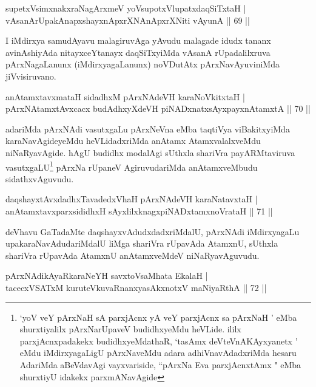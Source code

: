 \begin{shl}
supetxV\s simxnakxraNagArxmeV yoV\s supotxV\s lupatxdaqSiTxtaH |\\
vAsanArUpakAnapxshayxnApxrXNAnApxrXNiti vAyunA \hfill || 69 ||
\end{shl}

\begin{artha}
I iMdirxya samudAyavu malagiruvAga yAvudu malagade idudx tananx avinAshiyAda nitayxceYtanayx daqSiTxyiMda vAsanA rUpadalilxruva pArxNagaLanunx (iMdirxyagaLanunx) noVDutAtx pArxNavAyuviniMda jiVvisiruvano.
\end{artha}

\begin{shl}
anAtamxtavxmataH sidadhxM pArxNAdeVH karaNoVkitxtaH |\\
pArxNAtamxtAvxcacx budAdhxyXdeVH piNADxnatxsAyxpayxnAtamxtA \hfill || 70 ||
\end{shl}

\begin{artha}
adariMda pArxNAdi vasutxgaLu pArxNeVna eMba taqtiVya viBakitxyiMda karaNavAgideyeMdu heVLidadxriMda anAtamx AtamxvalalxveMdu niNaRyavAgide. hAgU budidhx modalAgi sUthxla shariVra payARMtaviruva vasutxgaLU\footnote[1]{`yoV veY pArxNaH sA parxjAcnx yA veY parxjAcnx sa pArxNaH ' eMba shurxtiyalilx pArxNarUpaveV budidhxyeMdu heVLide. ililx parxjAcnxpadakekx budidhxyeMdathaR, `tasAmx deVteVnAKAyxyanetx ' eMdu iMdirxyagaLigU pArxNaveMdu adara adhiVnavAdadxriMda hesaru AdariMda aBeVdavAgi vayxvariside, ``pArxNa Eva parxjAcnxtAmx " eMba shurxtiyU idakekx parxmANavAgide} pArxNa rUpaneV AgiruvudariMda anAtamxveMbudu sidathxvAguvudu.
\end{artha}%

\begin{shl}
daqshayxtAvxdadhxTavadedxVhaH pArxNAdeVH karaNatavxtaH |\\
anAtamxtavxparxsididhxH sAyxlilxknagxpiNADxtamxnoVrataH \hfill || 71 ||
\end{shl}

\begin{artha}
deVhavu GaTadaMte daqshayxvAdudxdadxriMdalU, pArxNAdi iMdirxyagaLu upakaraNavAdudariMdalU liMga shariVra rUpavAda AtamxnU, sUthxla shariVra rUpavAda AtamxnU anAtamxveMdeV niNaRyavAguvudu.
\end{artha}


\begin{shl}
pArxNAdikAyaRkaraNeYH savxtoV\s saMhata EkalaH |\\
tacecxVSATxM kuruteV\s kuvaRnanxyasAkxnotxV maNiyaRthA \hfill || 72 ||
\end{shl}	

